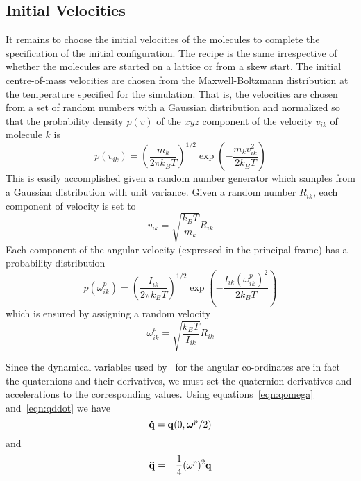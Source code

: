 \subsection{Initial Velocities}
\label{sec:velinit}
It remains to choose the initial velocities of the molecules to
complete the specification of the initial configuration.  The recipe
is the same irrespective of whether the molecules are started on a
lattice or from a skew start.  The initial centre-of-mass velocities
are chosen from the Maxwell-Boltzmann distribution at the temperature
specified for the simulation\cite[pp 170]{allen:87}.  That is, the
velocities are chosen from a set of random numbers with a Gaussian
distribution and normalized so that the probability density $p(v)$ of
the $xyz$ component of the velocity $v_{ik}$ of molecule $k$ is
\begin{equation}
p(v_{ik}) = \left ( \frac{m_k}{2 \pi k_B T}\right )^{1/2} 
\exp(-\frac{m_k v_{ik}^2}{2 k_B T})
\end{equation}
This is easily accomplished given a random number generator which
samples from a Gaussian distribution with unit variance.  Given a
random number $R_{ik}$, each component of velocity is set to
\begin{equation}
v_{ik} = \sqrt{\frac{k_B T}{m_k}} R_{ik}
\end{equation}
Each component of the angular velocity (expressed in the
principal frame) has a probability distribution
\begin{equation}
p(\omega^p_{ik}) = \left ( \frac{I_{ik}}{2 \pi k_B T}\right )^{1/2}
\exp(-\frac{I_{ik} (\omega^p_{ik})^2}{2 k_B T})
\end{equation}
which is ensured by assigning a random velocity
\begin{equation}
\label{eqn:omega-rand}
\omega^p_{ik} = \sqrt{\frac{k_B T}{I_{ik}}} R_{ik}
\end{equation}

Since the dynamical variables used by \moldy\ for the angular
co-ordinates are in fact the quaternions and their derivatives, we
must set the quaternion derivatives and accelerations to the corresponding
values. Using equations~\ref{eqn:qomega} and~\ref{eqn:qddot} we
have
\begin{equation}
{\bf \dot{q}} = {\bf q}(0,\mbox{\boldmath \protect\(\omega\protect\)}^p/2)
\end{equation}
and
\begin{equation}
{\bf \ddot{q}} = -\frac{1}{4}(\omega^p)^2 {\bf q}
\end{equation}

